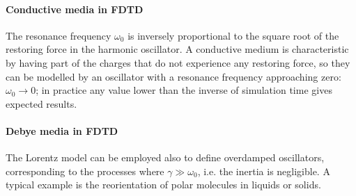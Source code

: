 
\paragraph{Conductive media in FDTD} %
The resonance frequency $\omega_0$ is inversely proportional to the square root of the restoring force in the harmonic oscillator. A conductive medium is characteristic by having part of the charges that do not experience any restoring force, so they can be modelled by an oscillator with a resonance frequency approaching zero: $\omega_0 \rightarrow 0$; in practice any value lower than the inverse of simulation time gives expected results.




\paragraph{Debye media in FDTD} \label{fdtd_debye} %
The Lorentz model can be employed also to define overdamped oscillators, corresponding to the processes where  $\gamma \gg \omega_0$, i.e. the inertia is negligible.
A typical example is the  reorientation of polar molecules in liquids or solids. 

